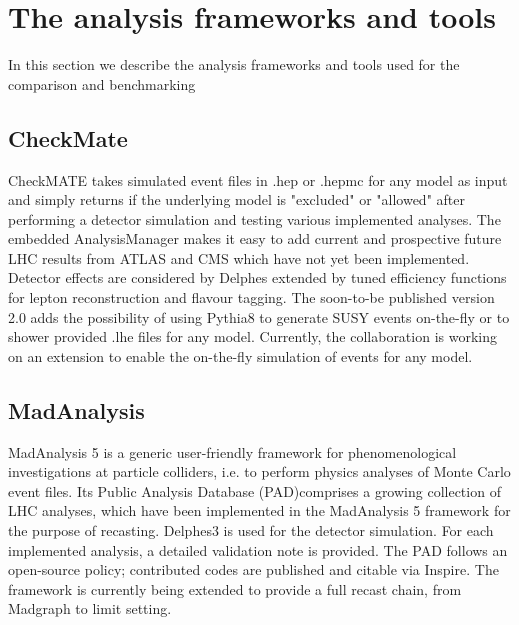 \documentclass[11pt]{cernrep}
\begin{document}
\section{The analysis frameworks and tools}
In this section we describe the analysis frameworks and tools used for the comparison and benchmarking

\subsection{CheckMate}
CheckMATE takes simulated event files in .hep or .hepmc for any model as input and simply returns if the underlying model is "excluded" or "allowed" after performing a detector simulation and testing various implemented analyses. The embedded AnalysisManager makes it easy to add current and prospective future LHC results from ATLAS and CMS which have not yet been implemented. Detector effects are considered by Delphes extended by tuned efficiency functions for lepton reconstruction and flavour tagging. The soon-to-be published version 2.0 adds the possibility of using Pythia8 to generate SUSY events on-the-fly or to shower provided .lhe files for any model. Currently, the collaboration is working on an extension to enable the on-the-fly simulation of events for any model.


\subsection{MadAnalysis}
MadAnalysis 5 is a generic user-friendly framework for phenomenological investigations at particle colliders, i.e. to perform physics analyses of Monte Carlo event files. Its Public Analysis Database (PAD)comprises a growing collection of LHC analyses, which have been implemented in the MadAnalysis 5 framework for the purpose of recasting. Delphes3 is used for the detector simulation. For each implemented analysis, a detailed validation note is provided. The PAD follows an open-source policy; contributed codes are published and citable via Inspire. The framework is currently being extended to provide a full recast chain, from Madgraph to limit setting.
\end{document}
